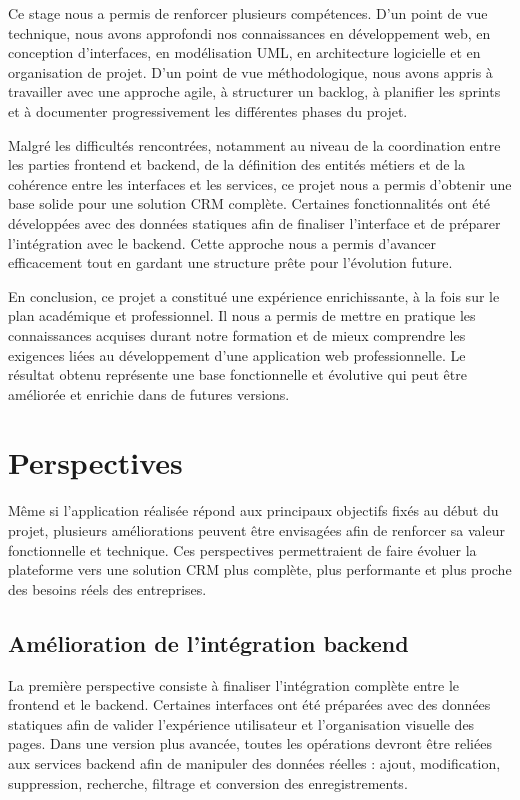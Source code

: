 \documentclass[12pt,a4paper]{report}
\begin{document}
Ce stage nous a permis de renforcer plusieurs compétences. D’un point de vue technique, nous avons approfondi nos connaissances en développement web, en conception d’interfaces, en modélisation UML, en architecture logicielle et en organisation de projet. D’un point de vue méthodologique, nous avons appris à travailler avec une approche agile, à structurer un backlog, à planifier les sprints et à documenter progressivement les différentes phases du projet.

Malgré les difficultés rencontrées, notamment au niveau de la coordination entre les parties frontend et backend, de la définition des entités métiers et de la cohérence entre les interfaces et les services, ce projet nous a permis d’obtenir une base solide pour une solution CRM complète. Certaines fonctionnalités ont été développées avec des données statiques afin de finaliser l’interface et de préparer l’intégration avec le backend. Cette approche nous a permis d’avancer efficacement tout en gardant une structure prête pour l’évolution future.

En conclusion, ce projet a constitué une expérience enrichissante, à la fois sur le plan académique et professionnel. Il nous a permis de mettre en pratique les connaissances acquises durant notre formation et de mieux comprendre les exigences liées au développement d’une application web professionnelle. Le résultat obtenu représente une base fonctionnelle et évolutive qui peut être améliorée et enrichie dans de futures versions.
\chapter*{Perspectives}

Même si l’application réalisée répond aux principaux objectifs fixés au début du projet, plusieurs améliorations peuvent être envisagées afin de renforcer sa valeur fonctionnelle et technique. Ces perspectives permettraient de faire évoluer la plateforme vers une solution CRM plus complète, plus performante et plus proche des besoins réels des entreprises.

\section*{Amélioration de l’intégration backend}

La première perspective consiste à finaliser l’intégration complète entre le frontend et le backend. Certaines interfaces ont été préparées avec des données statiques afin de valider l’expérience utilisateur et l’organisation visuelle des pages. Dans une version plus avancée, toutes les opérations devront être reliées aux services backend afin de manipuler des données réelles : ajout, modification, suppression, recherche, filtrage et conversion des enregistrements.
\end{document}
